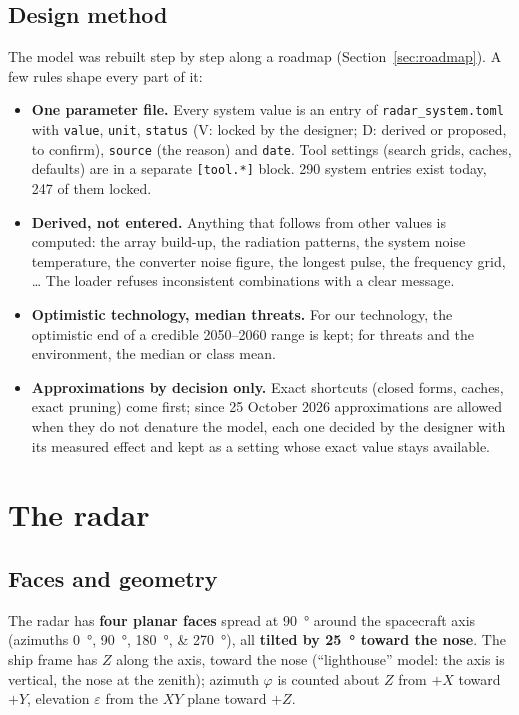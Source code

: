 \documentclass[11pt,a4paper]{article}
\newcommand{\code}[1]{\texttt{\small #1}}
\begin{document}
\subsection{Design method}
The model was rebuilt step by step along a roadmap (Section~\ref{sec:roadmap}). A few rules shape every part of it:
\begin{itemize}
  \item \textbf{One parameter file.} Every system value is an entry of \code{radar\_system.toml} with
        \code{value}, \code{unit}, \code{status} (V: locked by the designer; D: derived or proposed, to confirm),
        \code{source} (the reason) and \code{date}. Tool settings (search grids, caches, defaults) are in a separate
        \code{[tool.*]} block. 290 system entries exist today, 247 of them locked.
  \item \textbf{Derived, not entered.} Anything that follows from other values is computed: the array build-up, the
        radiation patterns, the system noise temperature, the converter noise figure, the longest pulse, the
        frequency grid, \dots{} The loader refuses inconsistent combinations with a clear message.
  \item \textbf{Optimistic technology, median threats.} For our technology, the optimistic end of a credible
        2050--2060 range is kept; for threats and the environment, the median or class mean.
  \item \textbf{Approximations by decision only.} Exact shortcuts (closed forms, caches, exact pruning) come first;
        since 25 October 2026 approximations are allowed when they do not denature the model, each one decided by
        the designer with its measured effect and kept as a setting whose exact value stays available.
\end{itemize}

\section{The radar}

\subsection{Faces and geometry}
The radar has \textbf{four planar faces} spread at \SI{90}{\degree} around the spacecraft axis (azimuths
\SIlist{0;90;180;270}{\degree}), all \textbf{tilted by \SI{25}{\degree} toward the nose}. The ship frame has $Z$
along the axis, toward the nose (``lighthouse'' model: the axis is vertical, the nose at the zenith); azimuth $\varphi$
is counted about $Z$ from $+X$ toward $+Y$, elevation $\varepsilon$ from the $XY$ plane toward $+Z$.
\end{document}

